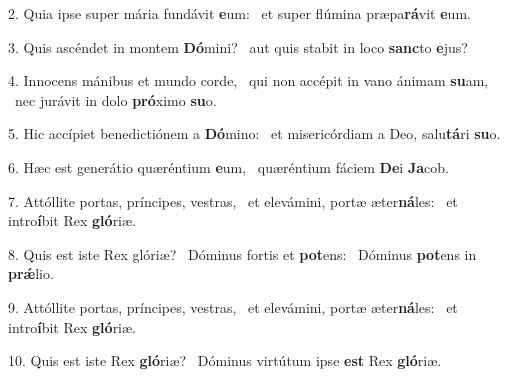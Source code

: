 2. Quia ipse super mária fundávit \textbf{e}um: \ast\  et super flúmina præpa\textbf{rá}vit \textbf{e}um.\

3. Quis ascéndet in montem \textbf{Dó}mini? \ast\  aut quis stabit in loco \textbf{sanc}to \textbf{e}jus?\

4. Innocens mánibus et mundo corde, \dag\  qui non accépit in vano ánimam \textbf{su}am, \ast\  nec jurávit in dolo \textbf{pró}ximo \textbf{su}o.\

5. Hic accípiet benedictiónem a \textbf{Dó}mino: \ast\  et misericórdiam a Deo, salu\textbf{tá}ri \textbf{su}o.\

6. Hæc est generátio quæréntium \textbf{e}um, \ast\  quæréntium fáciem \textbf{De}i \textbf{Ja}cob.\

7. Attóllite portas, príncipes, vestras, \dag\  et elevámini, portæ æter\textbf{ná}les: \ast\  et intro\textbf{í}bit Rex \textbf{gló}riæ.\

8. Quis est iste Rex glóriæ? \dag\  Dóminus fortis et \textbf{pot}ens: \ast\  Dóminus \textbf{pot}ens in \textbf{prǽ}lio.\

9. Attóllite portas, príncipes, vestras, \dag\  et elevámini, portæ æter\textbf{ná}les: \ast\  et intro\textbf{í}bit Rex \textbf{gló}riæ.\

10. Quis est iste Rex \textbf{gló}riæ? \ast\  Dóminus virtútum ipse \textbf{est} Rex \textbf{gló}riæ.\

